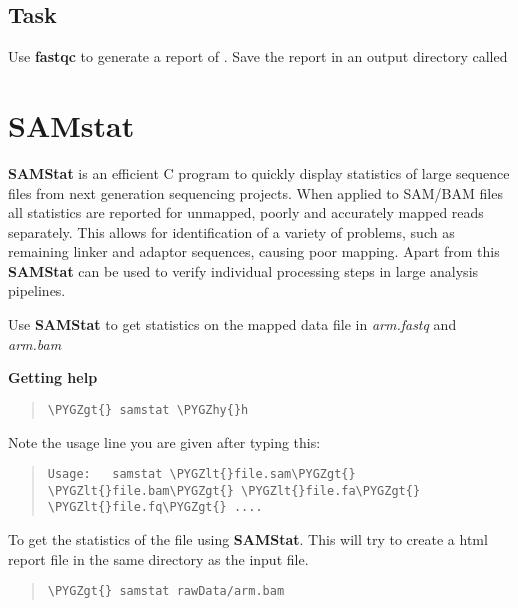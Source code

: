 \documentclass[a4paper,11pt,english]{sphinxmanual}
\def\PYGZlt{\char`\<}
\def\PYGZgt{\char`\>}
\def\PYGZhy{\char`\-}
\begin{document}
\subsection{Task}
\label{exercises/STEP1_QualityControl:task}
Use \textbf{fastqc} to generate a report of . Save the report in an output directory called 


\section{SAMstat}
\label{exercises/STEP1_QualityControl:samstat}
\textbf{SAMStat} is an efficient C program to quickly display statistics of large sequence files from next generation sequencing projects. When applied to SAM/BAM files all statistics are reported for unmapped, poorly and accurately mapped reads separately. This allows for identification of a variety of problems, such as remaining linker and adaptor sequences, causing poor mapping. Apart from this \textbf{SAMStat} can be used to verify individual processing steps in large analysis pipelines.

Use \textbf{SAMStat} to get statistics on the mapped data file in \emph{arm.fastq} and \emph{arm.bam}

\textbf{Getting help}
\begin{quote}

\begin{Verbatim}[frame=single, rulecolor=\color{lightgray}, fontfamily=courier, commandchars=\\\{\}]
\PYGZgt{} samstat \PYGZhy{}h
\end{Verbatim}
\end{quote}

Note the usage line you are given after typing this:
\begin{quote}

\begin{Verbatim}[frame=single, rulecolor=\color{lightgray}, fontfamily=courier, commandchars=\\\{\}]
Usage:   samstat \PYGZlt{}file.sam\PYGZgt{} \PYGZlt{}file.bam\PYGZgt{} \PYGZlt{}file.fa\PYGZgt{} \PYGZlt{}file.fq\PYGZgt{} ....
\end{Verbatim}
\end{quote}

To get the statistics of the  file using \textbf{SAMStat}. This will try to create a html report file in the same directory as the input file.
\begin{quote}

\begin{Verbatim}[frame=single, rulecolor=\color{lightgray}, fontfamily=courier, commandchars=\\\{\}]
\PYGZgt{} samstat rawData/arm.bam
\end{Verbatim}
\end{quote}
\end{document}
